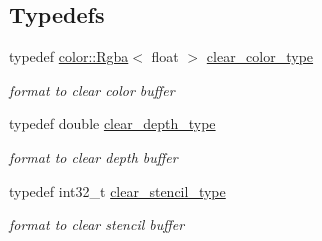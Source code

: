 \subsection*{Typedefs}
\begin{DoxyCompactItemize}
\item 
\hypertarget{namespacehryky_1_1opengl_acab4d3df4193bd85d7261be485efca10}{typedef \hyperlink{classhryky_1_1color_1_1_rgba}{color\-::\-Rgba}$<$ float $>$ \hyperlink{namespacehryky_1_1opengl_acab4d3df4193bd85d7261be485efca10}{clear\-\_\-color\-\_\-type}}\label{namespacehryky_1_1opengl_acab4d3df4193bd85d7261be485efca10}

\begin{DoxyCompactList}\small\item\em format to clear color buffer \end{DoxyCompactList}\item 
\hypertarget{namespacehryky_1_1opengl_a5d4a0c96ecaa596a64f1efed8a51c089}{typedef double \hyperlink{namespacehryky_1_1opengl_a5d4a0c96ecaa596a64f1efed8a51c089}{clear\-\_\-depth\-\_\-type}}\label{namespacehryky_1_1opengl_a5d4a0c96ecaa596a64f1efed8a51c089}

\begin{DoxyCompactList}\small\item\em format to clear depth buffer \end{DoxyCompactList}\item 
\hypertarget{namespacehryky_1_1opengl_a7340c1159eebfb6a57358d75a1b0629a}{typedef int32\-\_\-t \hyperlink{namespacehryky_1_1opengl_a7340c1159eebfb6a57358d75a1b0629a}{clear\-\_\-stencil\-\_\-type}}\label{namespacehryky_1_1opengl_a7340c1159eebfb6a57358d75a1b0629a}

\begin{DoxyCompactList}\small\item\em format to clear stencil buffer \end{DoxyCompactList}\end{DoxyCompactItemize}
